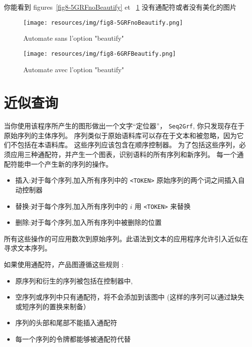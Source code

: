 \bigskip
\noindent 你能看到 figures~\ref{fig8-5GRFnoBeautify} et ~\ref{fig8-6GRFBeautify} 没有通配符或者没有美化的图片


\begin{figure}[h!]
	\begin{minipage}[h!]{0.5\linewidth}
		\centering
		\texttt{[image: resources/img/fig8-5GRFnoBeautify.png]}	
		\caption{Automate sans l'option "beautify"\label{fig8-5GRFnoBeautify}}
	\end{minipage}
	\hspace{0.1cm}
	\begin{minipage}[h!]{0.5\linewidth}
		\centering
		\texttt{[image: resources/img/fig8-6GRFBeautify.png]}
		\caption{Automate avec l'option "beautify"\label{fig8-6GRFBeautify}}
	\end{minipage}
	\hspace{0.1cm}
\end{figure}
\pagebreak


\section{近似查询}
\label{approximation}

当你使用该程序所产生的图形做出一个文字“定位器”，
\verb+Seq2Grf+, 你只发现存在于原始序列的主体序列。
序列类似于原始语料库可以存在于文本和被忽略，因为它们不包括在本语料库。
这些序列应该包含在顺序控制器。
为了包括这些序列，必须应用三种通配符，并产生一个图表，识别语料的所有序列和新序列。
每一个通配符能申一个产生新的序列的操作。

\begin{itemize}
	\item 插入:对于每个序列,加入所有序列中的
	\verb+<TOKEN>+ 原始序列的两个词之间插入自动控制器
	\item 替换:对于每个序列,加入所有序列中的 $i$	用 \verb+<TOKEN>+ 来替换
	\item 删除:对于每个序列,加入所有序列中被删除的位置
\end{itemize}
所有这些操作的可应用数次到原始序列。此语法到文本的应用程序允许引入近似在寻求文本序列。

如果使用通配符，产品图遵循这些规则 :
\begin{itemize}
	\item 原序列和衍生的序列被包括在控制器中,
	\item 空序列或序列中只有通配符，将不会添加到该图中
		  (这样的序列可以通过缺失或短序列的置换来制备）
	\item 序列的头部和尾部不能插入通配符
	\item 每一个序列的令牌都能够被通配符代替
\end{itemize}

